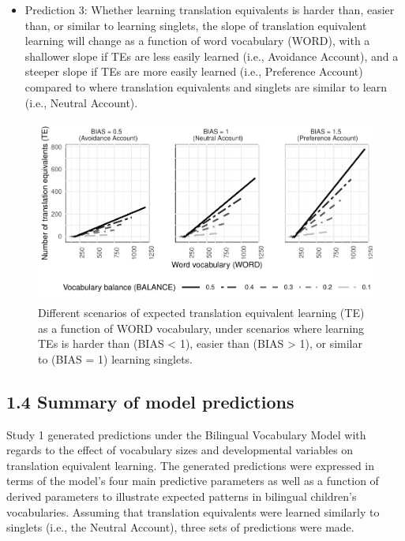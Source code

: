 \documentclass[
  english,
  ,man,floatsintext]{apa6}
\providecommand{\tightlist}{%
  \setlength{\itemsep}{0pt}\setlength{\parskip}{0pt}}
\begin{document}
\begin{itemize}
\tightlist
\item
  Prediction 3: Whether learning translation equivalents is harder than, easier than, or similar to learning singlets, the slope of translation equivalent learning will change as a function of word vocabulary (WORD), with a shallower slope if TEs are less easily learned (i.e., Avoidance Account), and a steeper slope if TEs are more easily learned (i.e., Preference Account) compared to where translation equivalents and singlets are similar to learn (i.e., Neutral Account).
\end{itemize}

\begin{figure}[H]

{\centering \includegraphics[width=1\linewidth,height=0.8\textheight]{paper_TE_bilingual_vocabulary_model_files/figure-latex/fig3-1} 

}

\caption{Different scenarios of expected translation equivalent learning (TE) as a function of WORD vocabulary, under scenarios where learning TEs is harder than (BIAS < 1), easier than (BIAS > 1), or similar to (BIAS = 1) learning singlets.}\label{fig:fig3}
\end{figure}

\hypertarget{summary-of-model-predictions}{%
\subsection{1.4 Summary of model predictions}\label{summary-of-model-predictions}}

Study 1 generated predictions under the Bilingual Vocabulary Model with regards to the effect of vocabulary sizes and developmental variables on translation equivalent learning. The generated predictions were expressed in terms of the model's four main predictive parameters as well as a function of derived parameters to illustrate expected patterns in bilingual children's vocabularies. Assuming that translation equivalents were learned similarly to singlets (i.e., the Neutral Account), three sets of predictions were made.
\end{document}
